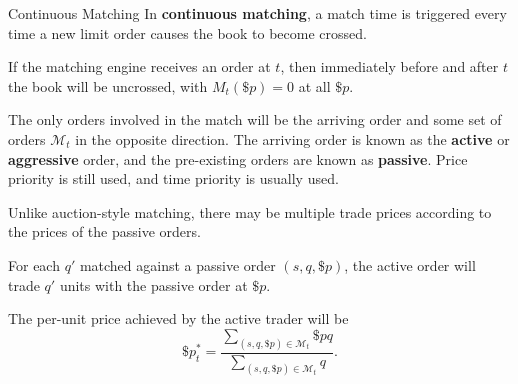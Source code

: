 \documentclass{beamer}
\begin{document}
\begin{frame}{Continuous Matching}
	In \textbf{continuous matching}, a match time is triggered every time a new limit order causes the book to become crossed.

	If the matching engine receives an order at $t$, then immediately before and after $t$ the book will be uncrossed, with $M_t(\$p)=0$ at all $\$p$.

	The only orders involved in the match will be the arriving order and some set of orders $\mathcal{M}_t$ in the opposite direction. The arriving order is known as the \textbf{active} or \textbf{aggressive} order, and the pre-existing orders are known as \textbf{passive}. Price priority is still used, and time priority is usually used. %


	\pause

	Unlike auction-style matching, there may be multiple trade prices according to the prices of the passive orders.

	For each $q'$ matched against a passive order $(s,q,\$p)$, the active order will trade $q'$ units with the passive order at $\$p$. %

	The per-unit price achieved by the active trader will be
	$$\$p^*_t = \frac{\sum_{(s,q,\$p)\in\mathcal{M}_t} \$pq}{\sum_{(s,q,\$p)\in\mathcal{M}_t} q}.$$ %



\end{frame}
\end{document}
